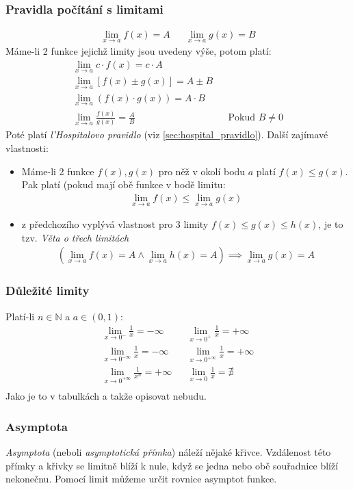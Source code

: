 \documentclass[12pt]{article}
\newcommand{\nN}{\mathbb{N}} %
\begin{document}
\subsubsection{Pravidla počítání s limitami}
\begin{align}
 \lim _{x\to a} f(x) = A &&  \lim _{x\to a} g(x) = B 
\end{align}
Máme-li 2 funkce jejichž limity jsou uvedeny výše, potom platí:
\begin{align}
 \lim _{x\to a}c \cdot f(x)=c \cdot A\\
 \lim _{x\to a}[f(x)\pm g(x)]=A\pm B\\
 \lim _{x\to a}\left( f(x) \cdot g(x) \right)=A \cdot B\\
\lim _{x\to a}{\frac {f(x)}{g(x)}}={\frac {A}{B}} && \text{Pokud $B \neq 0$}
\end{align}
Poté platí \emph{l'Hospitalovo pravidlo} (viz \ref{sec:hospital_pravidlo}). Další zajímavé vlastnosti:
\begin{itemize}
\item Máme-li 2 funkce $f(x),g(x)$ pro něž v okolí bodu $a$ platí $f(x) \leq g(x)$. Pak platí (pokud mají obě funkce v bodě limitu:
\begin{align}
\lim _{x\to a}f(x)\leq \lim _{x\to a}g(x)
\end{align}
\item z předchozího vyplývá vlastnost pro 3 limity $ f(x)\leq g(x)\leq h(x)$, je to tzv. \emph{Věta o třech limitách}
\begin{align}
\left(  \lim _{x\to a}f(x)=A \land \lim _{x\to a}h(x)=A \right) \implies  \lim _{x\to a}g(x)=A 
\end{align}
\end{itemize}
\subsubsection{Důležité limity}
Platí-li $n \in \nN$ a $a \in (0,1)$:
\begin{align}
\lim_{x \to 0^-} \frac{1}{x} = - \infty && \lim_{x \to 0^+} \frac{1}{x} = + \infty \\
\lim_{x \to 0^{-\infty}} \frac{1}{x} = - \infty && \lim_{x \to 0^{+ \infty}} \frac{1}{x} = + \infty \\
\lim_{x \to 0^{+ \infty}} \frac{1}{x^n} = + \infty && \lim_{x \to 0} \frac{1}{x} = \nexists\\
\end{align}
Jako je to v tabulkách a takže opisovat nebudu.
\subsubsection{Asymptota}
\emph{Asymptota} (neboli \emph{asymptotická přímka}) náleží nějaké křivce.  Vzdálenost této přímky a křivky se limitně blíží k nule, když se jedna nebo obě souřadnice blíží nekonečnu. Pomocí limit můžeme určit rovnice asymptot funkce. \\
\end{document}
